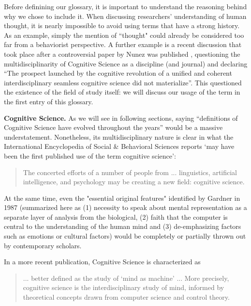 \documentclass[../main.tex]{subfiles}
\begin{document}
Before definining our glossary, it is important to understand the reasoning behind why we chose to include it. When discussing researchers' understanding of human thought, it is nearly impossible to avoid using terms that have a strong history. As an example, simply the mention of ``thought" could already be considered too far from a behaviorist perspective. A further example is a recent discussion that took place after a controversial paper by Nunez was published \cite{nunezWhatHappenedCognitive2019}, questioning the multidisciplinarity of Cognitive Science as a discipline (and journal) and declaring \enquote{The prospect launched by the cognitive revolution of a unified and coherent interdisciplinary seamless cognitive science did not materialize}. This questioned the existence of the field of study itself: we will discuss our usage of the term in the first entry of this glossary.


\vspace{5pt}
\textbf{Cognitive Science.} As we will see in following sections, saying \enquote{definitions of Cognitive Science have evolved throughout the years} would be a massive understatement. Nonetheless, its multidisciplinary nature is clear in what the International Encyclopedia of Social \& Behavioral Sciences \cite{InternationalEncyclopediaSocial} reports \enquote*{may have been the first published use of the term cognitive science}:
\begin{quote}
    The concerted efforts of a number of people from ... linguistics, artificial intelligence, and psychology may be creating a new field: cognitive science.
\end{quote}

At the same time, even the "essential original features" identified by Gardner in 1987 \cite{gardnerMindNewScience1987} (summarized here as (1) necessity to speak about mental representation as a separate layer of analysis from the biological, (2) faith that the computer is central to the understanding of the human mind and (3) de-emphasizing factors such as emotions or cultural factors) would be completely or partially thrown out by contemporary scholars.

In a more recent publication\cite{bodenMindMachineHistory2008}, Cognitive Science is characterized as
\begin{quote}
    ... better defined as the study of ‘mind as machine’ ... More precisely, cognitive science is the interdisciplinary study of mind, informed by theoretical concepts drawn from computer science and control theory.
\end{quote}
\end{document}
